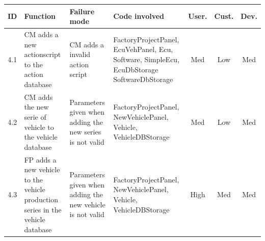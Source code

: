 \begin{landscape}
		\begin{table}[H]
			\begin{tabular}{ c | p{5cm} | p{5cm} | p{5cm} | c | c | c}
				\hline
				{\bf ID} & {\bf Function} & {\bf Failure mode} & {\bf Code involved} & 
				{\bf User.} & {\bf Cust.} & {\bf Dev.} \\ \hline
				4.1
				& CM adds a new actionscript to the action database
				& CM adds a invalid action script
				& FactoryProjectPanel, EcuVehPanel, Ecu, Software, SimpleEcu, EcuDbStorage
				SoftwareDbStorage
				& Med & Low & Med \\ \hline
				4.2
				& CM adds the new serie of vehicle to the vehicle database
				& Parameters given when adding the new series is not valid
				& FactoryProjectPanel, NewVehiclePanel, Vehicle, VehicleDBStorage
				& Med & Low & Med \\ \hline
				4.3
				& FP adds a new vehicle to the vehicle production series in the vehicle database
				& Parameters given when adding the new vehicle is not valid
				& FactoryProjectPanel, NewVehiclePanel, Vehicle, VehicleDBStorage
				& High & Med & Med \\ \hline

			\end{tabular}
		\end{table}


\end{landscape}